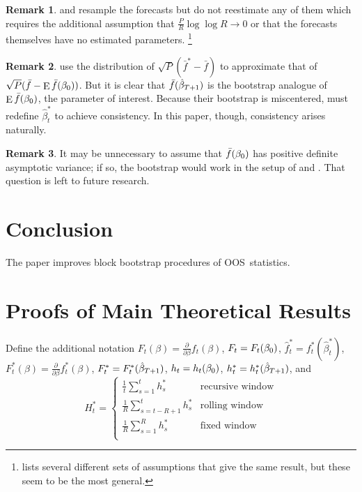 \documentclass[12pt,fleqn]{article}
\theoremstyle{definition}
\newtheorem{rem}{Remark}
\DeclareMathOperator{\E}{E}
\newcommand{\btrue}[1][]{\if#1*\hat\beta_{T+1}\else\beta_0\fi}
\newcommand{\oos}{OOS}
\begin{document}
\begin{rem}
  \citet{Whi:00} and \citet{Han:05} resample the forecasts but do not
  reestimate any of them which requires the additional assumption that
  $\tfrac{P}{R} \log \log R \to 0$ or that the forecasts themselves
  have no estimated parameters.%
\footnote{\citet{Whi:00} lists several
    different sets of assumptions that give the same result, but these
    seem to be the most general.} %
\end{rem}

\begin{rem}
  \citet{CoS:07} use the distribution of $\sqrt{P}(\bar{f}^{*} -
  \bar{f})$ to approximate that of $\sqrt{P}(\bar{f} - \E
  \bar{f}(\btrue))$.  But it is clear that $\bar{f}(\btrue[*])$
  is the bootstrap analogue of $\E \bar{f}(\btrue)$, the parameter of
  interest.  Because their bootstrap is miscentered, \citet{CoS:07}
  must redefine $\hat{\beta}_t^{*}$ to achieve consistency.  In this
  paper, though, consistency arises naturally.
\end{rem}

\begin{rem}
  It may be unnecessary to assume that $\bar{f}(\btrue)$ has positive
  definite asymptotic variance; if so, the bootstrap would work in the
  setup of \citet{ClM:05,ClM:01} and \citet{Mcc:07}.  That question is
  left to future research.
\end{rem}

\section{Conclusion}\label{sec:4}
The paper improves block bootstrap procedures of \oos\
statistics.

\appendix
\section{Proofs of Main Theoretical Results}\label{sec:B}

Define the additional notation 
$F_t(\beta) = \tfrac{\partial}{\partial \beta} f_t(\beta)$,
$F_t = F_t(\btrue)$,
$\hat f_t^* = f_t^*(\hat\beta_t^*)$,
$F_t^*(\beta) = \tfrac{\partial}{\partial \beta} f_t^*(\beta)$,
$F_t^* = F_t^*(\btrue[*])$,
$h_t = h_t(\btrue)$,
$h_t^* = h_t^*(\btrue[*])$, 
and
\begin{equation*}
      H_{t}^* = \begin{cases} 
        \tfrac1t \sum_{s=1}^t h_{s}^* & \text{recursive window} \\
        \tfrac1R \sum_{s=t-R+1}^t h_{s}^* & \text{rolling window} \\
        \tfrac1R \sum_{s=1}^R h_{s}^* & \text{fixed window} \\
      \end{cases}
\end{equation*}
\end{document}
